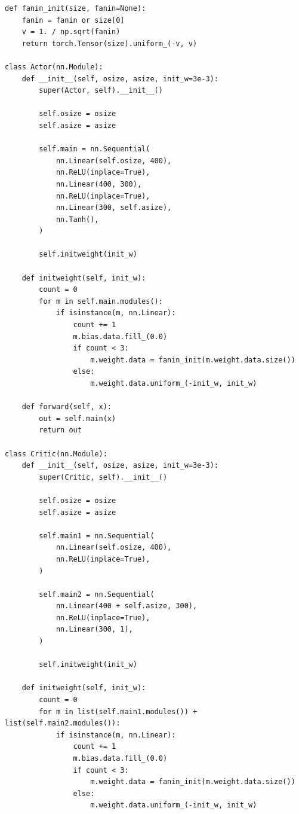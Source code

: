 \documentclass[12pt]{article}
\begin{document}
\begin{verbatim}
def fanin_init(size, fanin=None):
    fanin = fanin or size[0]
    v = 1. / np.sqrt(fanin)
    return torch.Tensor(size).uniform_(-v, v)

class Actor(nn.Module):
    def __init__(self, osize, asize, init_w=3e-3):
        super(Actor, self).__init__()
        
        self.osize = osize
        self.asize = asize
        
        self.main = nn.Sequential(
            nn.Linear(self.osize, 400),
            nn.ReLU(inplace=True),
            nn.Linear(400, 300),
            nn.ReLU(inplace=True),
            nn.Linear(300, self.asize),
            nn.Tanh(),
        )
        
        self.initweight(init_w)
    
    def initweight(self, init_w):
        count = 0
        for m in self.main.modules():
            if isinstance(m, nn.Linear):
                count += 1
                m.bias.data.fill_(0.0)
                if count < 3:
                    m.weight.data = fanin_init(m.weight.data.size())
                else:
                    m.weight.data.uniform_(-init_w, init_w)
    
    def forward(self, x):
        out = self.main(x)
        return out

class Critic(nn.Module):
    def __init__(self, osize, asize, init_w=3e-3):
        super(Critic, self).__init__()
        
        self.osize = osize
        self.asize = asize
        
        self.main1 = nn.Sequential(
            nn.Linear(self.osize, 400),
            nn.ReLU(inplace=True),
        )
        
        self.main2 = nn.Sequential(
            nn.Linear(400 + self.asize, 300),
            nn.ReLU(inplace=True),
            nn.Linear(300, 1),
        )
        
        self.initweight(init_w)
    
    def initweight(self, init_w):
        count = 0
        for m in list(self.main1.modules()) + list(self.main2.modules()):
            if isinstance(m, nn.Linear):
                count += 1
                m.bias.data.fill_(0.0)
                if count < 3:
                    m.weight.data = fanin_init(m.weight.data.size())
                else:
                    m.weight.data.uniform_(-init_w, init_w)
    

\end{verbatim}
\end{document}
